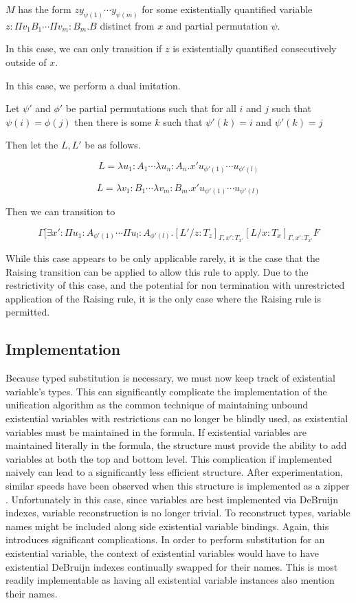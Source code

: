 $M$ has the form $z y_{\psi(1)} \cdots y_{\psi(m)}$
for some existentially quantified variable $z : \Pi v_1 B_1 \cdots \Pi v_m : B_m . B$ 
distinct from $x$ and partial permutation $\psi$. 

In this case, we can only transition if $z$ is existentially 
quantified consecutively outside of $x$.

In this case, we perform a dual imitation.

Let $\psi'$ and $\phi'$ be partial permutations 
such that for all $i$ and $j$ such that
$\psi(i) = \phi(j)$ then there is some $k$ such that
$\psi'(k) = i$ and $\psi'(k) = j$

Then let the $L,L'$ be as follows.

\[
L = \lambda u_1 : A_1 \cdots \lambda u_n : A_n . x' u_{\phi'(1)} \cdots u_{\phi'(l)}
\]

\[
L = \lambda v_1 : B_1 \cdots \lambda v_m : B_m . x' u_{\psi'(1)} \cdots u_{\psi'(l)}
\]

Then we can transition to

\[
\Gamma [ \exists x' : \Pi u_1 : A_{\phi'(1) } \cdots \Pi u_l : A_{\phi'(l)}
. [L'/z : T_z]_{\Gamma, x': T_{x'}}[L / x : T_x]_{\Gamma, x': T_{x'}} F
\]
 
While this case appears to be only applicable rarely,
it is the case that the Raising transition can be applied to allow this
rule to apply.  
Due to the restrictivity of this case, and the potential
for non termination with unrestricted application of the Raising rule,
it is the only case where the Raising rule is permitted.  


\subsection{Implementation}

Because typed substitution is necessary, we must now keep track of existential variable's
types.  This can significantly complicate the implementation of the unification algorithm
as the common technique of maintaining unbound existential variables with restrictions
can no longer be blindly used, as existential variables must be maintained in the 
formula.  If existential variables are maintained literally in the formula, 
the structure must provide the ability to add variables at both the top and bottom level.
This complication if implemented naively can lead to a significantly less efficient structure.
After experimentation, similar speeds have been observed when this structure is implemented
as a zipper \citep{huet1997functional}.  Unfortunately in this case, since variables are best 
implemented via DeBruijn indexes, variable reconstruction is no longer trivial. 
To reconstruct types, variable names might be included along side existential variable bindings.  
Again, this introduces significant complications.  In order to perform 
substitution for an existential variable, the context of existential variables would have to have
existential DeBruijn indexes continually swapped for their names.  
This is most readily implementable as having all existential variable instances 
also mention their names.

